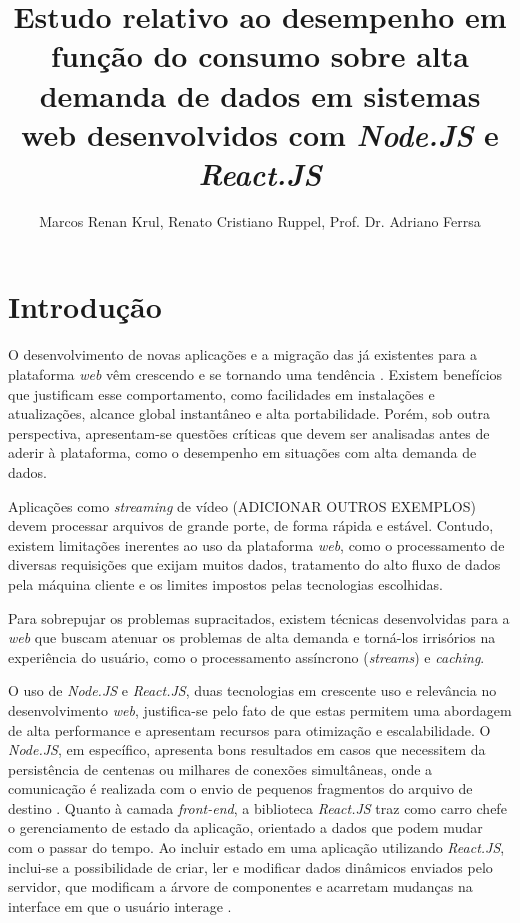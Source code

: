 \documentclass[12pt]{article}
\title{Estudo relativo ao desempenho em função do consumo sobre alta demanda de dados em sistemas web desenvolvidos com \textit{Node.JS} e \textit{React.JS}}
\author{Marcos Renan Krul\inst{1}, Renato Cristiano Ruppel\inst{1}, Prof. Dr. Adriano Ferrsa\inst{1}}
\begin{document}
 

\maketitle


\begin{resumo} 
\end{resumo}


\begin{abstract} 
\end{abstract}


\section{Introdução}

O desenvolvimento de novas aplicações e a migração das já existentes para a plataforma \textit{web} 
vêm crescendo e se tornando uma tendência \cite{SOUZAB}. Existem benefícios que justificam esse comportamento,
como facilidades em instalações e atualizações, alcance global instantâneo e alta portabilidade. Porém,
sob outra perspectiva, apresentam-se questões críticas que devem ser analisadas antes de aderir à plataforma, como
o desempenho em situações com alta demanda de dados.

Aplicações como \textit{streaming} de vídeo (ADICIONAR OUTROS EXEMPLOS) devem processar arquivos de 
grande porte, de forma rápida e estável. Contudo, existem limitações inerentes ao uso da 
plataforma \textit{web}, como o processamento de diversas requisições que exijam muitos dados, 
tratamento do alto fluxo de dados pela máquina cliente e os limites impostos pelas tecnologias escolhidas.

Para sobrepujar os problemas supracitados, existem técnicas desenvolvidas para a \textit{web} que buscam
atenuar os problemas de alta demanda e torná-los irrisórios na experiência do usuário, como o processamento
assíncrono (\textit{streams}) e \textit{caching}.

O uso de \textit{Node.JS} e \textit{React.JS}, duas tecnologias em crescente uso e relevância no
desenvolvimento \textit{web}, justifica-se pelo fato de que estas permitem uma abordagem de alta
performance e apresentam recursos para otimização e escalabilidade. O \textit{Node.JS}, em específico, apresenta
bons resultados em casos que necessitem da persistência de centenas ou milhares de conexões
simultâneas, onde a comunicação é realizada com o envio de pequenos fragmentos do arquivo de destino
\cite[p. 112]{EJSMONT}. Quanto à camada \textit{front-end}, a biblioteca \textit{React.JS} traz como
carro chefe o gerenciamento de estado da aplicação, orientado a dados que podem mudar com o passar do tempo.
Ao incluir estado em uma aplicação utilizando \textit{React.JS}, inclui-se a possibilidade de criar, ler
e modificar dados dinâmicos enviados pelo servidor, que modificam a árvore de componentes e acarretam 
mudanças na interface em que o usuário interage \cite[p. 97]{BANKSEPORCELLO}.
\end{document}
